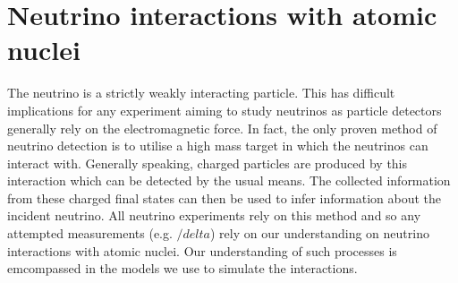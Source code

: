 


\chapter{Neutrino interactions with atomic nuclei}
\label{chap:NeutrinoInteractionsAtomicNuclei}
The neutrino is a strictly weakly interacting particle.  This has difficult implications for any experiment aiming to study neutrinos as particle detectors generally rely on the electromagnetic force.  In fact, the only proven method of neutrino detection is to utilise a high mass target in which the neutrinos can interact with.  Generally speaking, charged particles are produced by this interaction which can be detected by the usual means.  The collected information from these charged final states can then be used to infer information about the incident neutrino.  All neutrino experiments rely on this method and so any attempted measurements (e.g. $/delta$) rely on our understanding on neutrino interactions with atomic nuclei.  Our understanding of such processes is emcompassed in the models we use to simulate the interactions.

